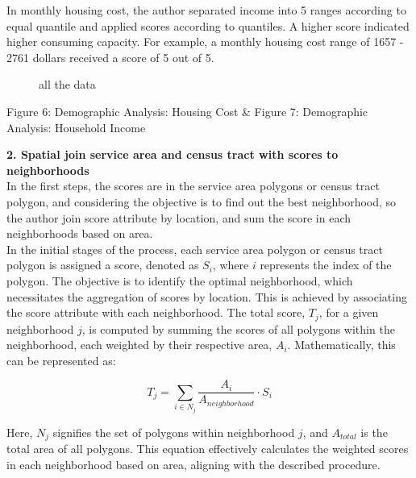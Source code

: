 \documentclass[11pt]{article}
\begin{document}
In monthly housing cost, the author separated income into 5 ranges according to equal quantile and applied scores according to quantiles. A higher score indicated higher consuming capacity. For example, a monthly housing cost range of 1657 - 2761 dollars received a score of 5 out of 5.


\begin{figure}[H] 
    \centering
    \hfill%
    \caption{all the data}
\end{figure}

\begin{center}
\centering
Figure 6: Demographic Analysis: Housing Cost \& Figure 7: Demographic Analysis: Household Income
\end{center}


\textbf{2. Spatial join service area and census tract with scores to neighborhoods\\}
In the first steps, the scores are in the service area polygons or census tract polygon, and considering the objective is to find out the best neighborhood, so the author join score attribute by location, and sum the score in each neighborhoods based on area.\\
In the initial stages of the process, each service area polygon or census tract polygon is assigned a score, denoted as $S_i$, where $i$ represents the index of the polygon. The objective is to identify the optimal neighborhood, which necessitates the aggregation of scores by location. This is achieved by associating the score attribute with each neighborhood. The total score, $T_j$, for a given neighborhood $j$, is computed by summing the scores of all polygons within the neighborhood, each weighted by their respective area, $A_i$. Mathematically, this can be represented as:

\begin{equation}
T_j = \sum_{i \in N_j} \frac{A_i}{A_{neighborhood}} \cdot S_i
\end{equation}

Here, $N_j$ signifies the set of polygons within neighborhood $j$, and $A_{total}$ is the total area of all polygons. This equation effectively calculates the weighted scores in each neighborhood based on area, aligning with the described procedure.
\end{document}
